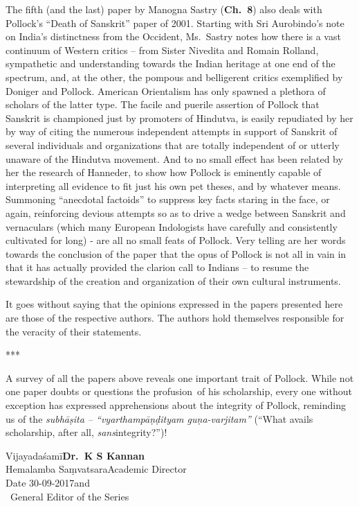 The fifth (and the last) paper by Manogna Sastry ({\bf Ch.~8}) also deals with Pollock’s “Death of Sanskrit” paper of 2001. Starting with Sri Aurobindo’s note on India’s distinctness from the Occident, Ms.\ Sastry notes how there is a vast continuum of Western critics – from Sister Nivedita and Romain Rolland, sympathetic and understanding towards the Indian heritage at one end of the spectrum, and, at the other, the pompous and belligerent critics exemplified by Doniger and Pollock. American Orientalism has only spawned a plethora of scholars of the latter type. The facile and puerile assertion of Pollock  that Sanskrit is championed just by promoters of Hindutva,  is easily repudiated by her by way of citing the numerous independent attempts in support of Sanskrit of several individuals and organizations that are totally independent of or utterly unaware of the Hindutva movement. And to no small effect has been related by her the research of Hanneder, to show how Pollock is eminently capable of interpreting all evidence to fit just his own pet theses, and by whatever means. Summoning “anecdotal factoids” to suppress key facts staring in the face, or again, reinforcing devious attempts so as to drive a wedge between Sanskrit and vernaculars (which many European Indologists have carefully and consistently cultivated for long) - are all no small feats of Pollock. Very telling are her words towards the conclusion of the paper that the opus of Pollock is not all in vain in that it has actually provided the clarion call to Indians – to resume the stewardship of the creation and organization of their own cultural instruments.

It goes without saying that the opinions expressed in the papers presented here are those of the respective authors. The authors hold themselves responsible for the veracity of their statements.

\begin{center}***\end{center}

A survey of all the papers above reveals one important trait of Pollock. While not one paper doubts or questions the profusion~of his scholarship, every one without exception has expressed apprehensions about the integrity of Pollock, reminding us of the {\sl subhāṣita –  “vyartham\break pāṇḍityam guṇa-varjitam”} (“What avails scholarship, after all, {\sl sans}\break integrity?”)! 
\bigskip

\noindent
Vijayadaśamī\hfill	{\bf Dr.~K S Kannan}\\
Hemalamba Saṃvatsara\hfill Academic Director\\
Date 30-09-2017\hfill and\\	
\phantom{.}~\hfill General Editor of the Series  






